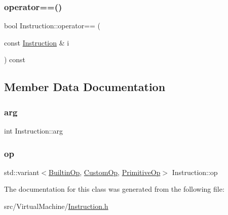 \subsubsection{\texorpdfstring{operator==()}{operator==()}}
{\footnotesize\ttfamily bool Instruction\+::operator== (\begin{DoxyParamCaption}\item[{const \hyperlink{class_instruction}{Instruction} \&}]{i }\end{DoxyParamCaption}) const\hspace{0.3cm}{\ttfamily [inline]}}



\subsection{Member Data Documentation}
\mbox{\label{class_instruction_a7ed399e29ec58e97a7b6311919f5d5ca}} 
\subsubsection{\texorpdfstring{arg}{arg}}
{\footnotesize\ttfamily int Instruction\+::arg}

\mbox{\label{class_instruction_ace2bace7950c18f67d1568fb56e9e6de}} 
\subsubsection{\texorpdfstring{op}{op}}
{\footnotesize\ttfamily std\+::variant$<$\hyperlink{_instruction_8h_af2fb7c87c5854c5733d7bb0506b06de7}{Builtin\+Op}, \hyperlink{_instruction_8h_a3a20ca4a8f0ab220518b030cc23ffee4}{Custom\+Op}, \hyperlink{_instruction_8h_a227278394efd1e2313c727102db09ea9}{Primitive\+Op}$>$ Instruction\+::op}



The documentation for this class was generated from the following file\+:\begin{DoxyCompactItemize}
\item 
src/\+Virtual\+Machine/\hyperlink{_instruction_8h}{Instruction.\+h}\end{DoxyCompactItemize}
